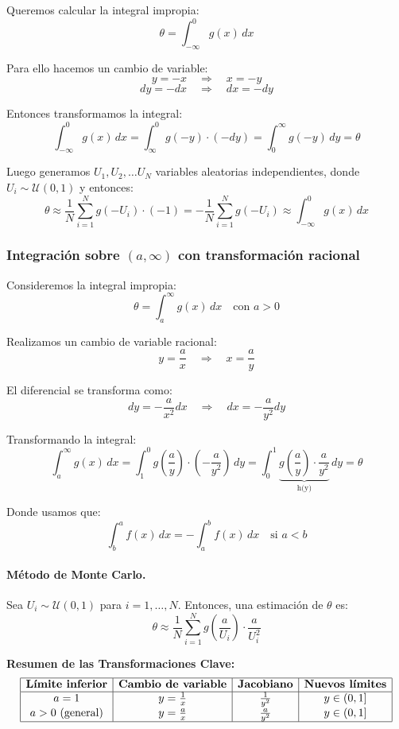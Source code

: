 \documentclass[11pt, a4paper]{article}
\theoremstyle{definition}
\begin{document}
Queremos calcular la integral impropia:
\[
\theta = \int_{-\infty}^{0} g(x) \, dx
\]

Para ello hacemos un cambio de variable:
\[
y = -x \quad \Rightarrow \quad x = -y
\]
\[
dy = -dx \quad \Rightarrow \quad dx = -dy
\]

Entonces transformamos la integral:
\[
\int_{-\infty}^{0} g(x) \, dx = \int_{\infty}^{0} g(-y) \cdot (-dy) = \int_{0}^{\infty} g(-y) \, dy = \theta
\]

Luego generamos $U_1, U_2, \ldots U_N$ variables aleatorias independientes, donde $U_i \sim \mathcal{U}(0,1)$ y entonces:
\[
\theta \approx \frac{1}{N} \sum_{i=1}^{N} g(-U_i) \cdot (-1) = -\frac{1}{N} \sum_{i=1}^{N} g(-U_i) \approx \int_{-\infty}^{0} g(x) \, dx
\]

\subsubsection{Integración sobre $(a, \infty)$ con transformación racional}

Consideremos la integral impropia:
\[
\theta = \int_{a}^{\infty} g(x) \, dx \quad \text{con } a > 0
\]

Realizamos un cambio de variable racional:
\[
y = \frac{a}{x} \quad \Rightarrow \quad x = \frac{a}{y}
\]

El diferencial se transforma como:
\[
dy = -\frac{a}{x^2}dx \quad \Rightarrow \quad dx = -\frac{a}{y^2}dy
\]

Transformando la integral:
\[
\int_{a}^{\infty} g(x) \, dx = \int_{1}^{0} g\left(\frac{a}{y}\right) \cdot \left(-\frac{a}{y^2}\right) \, dy = \int_{0}^{1} \underbrace{g\left(\frac{a}{y}\right) \cdot \frac{a}{y^2}}_{\text{h(y)}} \, dy = \theta
\]

\noindent Donde usamos que:
\[
\int_{b}^{a} f(x)\,dx = -\int_{a}^{b} f(x)\,dx \quad \text{si } a < b
\]

\vspace{0.5em}
\paragraph{Método de Monte Carlo.} Sea $U_i \sim \mathcal{U}(0,1)$ para $i = 1, \ldots, N$. Entonces, una estimación de $\theta$ es:
\[
\theta \approx \frac{1}{N} \sum_{i=1}^{N} g\left(\frac{a}{U_i}\right) \cdot \frac{a}{U_i^2}
\]

\vspace{1em}
\noindent \textbf{Resumen de las Transformaciones Clave:}
\[
\begin{array}{|c|c|c|c|}
\hline
\textbf{Límite inferior} & \textbf{Cambio de variable} & \textbf{Jacobiano} & \textbf{Nuevos límites} \\
\hline
a = 1 & y = \frac{1}{x} & \frac{1}{y^2} & y \in (0,1] \\
a > 0 \text{ (general)} & y = \frac{a}{x} & \frac{a}{y^2} & y \in (0,1] \\
\hline
\end{array}
\]
\end{document}

